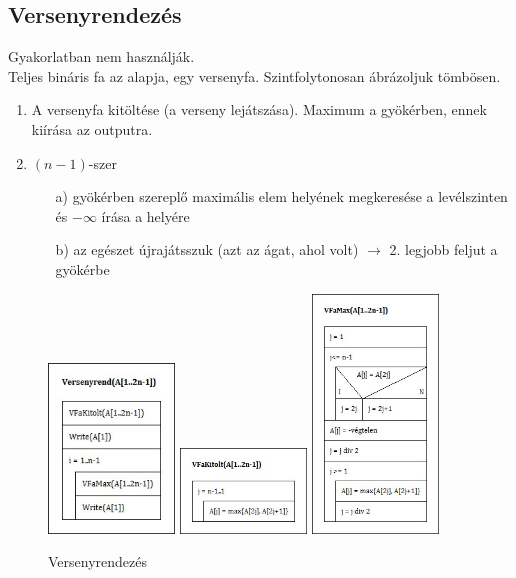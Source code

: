 \documentclass[margin=0px]{article}
\begin{document}
	\subsection{Versenyrendezés}
	
	Gyakorlatban nem használják. \\
	Teljes bináris fa az alapja, egy versenyfa. Szintfolytonosan ábrázoljuk tömbösen.\\
	\begin{enumerate}
		\item A versenyfa kitöltése (a verseny lejátszása). Maximum a gyökérben, ennek kiírása az outputra.
		\item $(n-1)$-szer
		\begin{itemize}
			\item[a)] gyökérben szereplő maximális elem helyének megkeresése a levélszinten és $-\infty$ írása a helyére
			\item[b)] az egészet újrajátsszuk (azt az ágat, ahol volt) $\to$ 2. legjobb feljut a gyökérbe
		\end{itemize}
	\end{enumerate}
	\begin{figure}[H]
		\centering
		\includegraphics[width=0.3\textwidth]{img/Versenyrend.jpg}
		\includegraphics[width=0.3\textwidth]{img/VFaKitolt.jpg}
		\includegraphics[width=0.3\textwidth]{img/VFaMax.jpg}
		\caption{Versenyrendezés}
	\end{figure}
	
\end{document}
